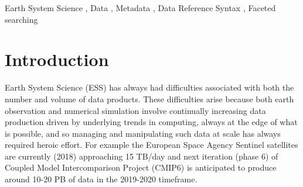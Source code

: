 \documentclass[final,1p,times,twocolumn,authoryear]{elsarticle}
\begin{document}
\begin{frontmatter}
\begin{abstract}
\end{abstract}



\begin{keyword}
Earth System Science \sep
Data \sep 
Metadata \sep
Data Reference Syntax \sep 
Faceted searching




\end{keyword}

\end{frontmatter}



\section{Introduction}

Earth System Science (ESS) has always had difficulties associated with both the number and volume of data products. 
These difficulties arise because both earth observation and numerical simulation involve continually increasing data production driven by underlying trends in computing, always at the edge of what is possible, and so managing and manipulating such data at scale has always required heroic effort.
For example the European Space Agency Sentinel satellites \citep{BerEA12} are currently (2018) approaching 15 TB/day \citep[5PB/year ---][]{Sentinel2019} and next iteration (phase 6) of Coupled Model Intercomparison Project (CMIP6) is anticipated to produce around 10-20 PB of data in the 2019-2020 timeframe.
  
\end{document}
